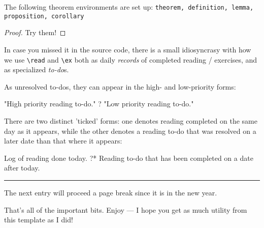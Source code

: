 \documentclass[%
	raggedright, %
]{journal}
\begin{document}

\logday
\begin{theorem}
The following theorem environments are set up: {\tt theorem, definition, lemma,
proposition, corollary}
\end{theorem}
\begin{proof}
Try them!
\end{proof}


\logday[1]
In case you missed it in the source code, there is a small idiosyncrasy with
how we use \verb|\read| and \verb|\ex| both as daily \emph{records} of completed
reading / exercises, and as specialized \emph{to-do}s.

\vspace{1em}
As unresolved to-dos, they can appear in the high- and low-priority forms:
\begin{tasklist}
	\read "High priority reading to-do."
	\read? "Low priority reading to-do."
\end{tasklist}

There are two distinct 'ticked' forms: one denotes reading completed on the same day as it
appears, while the other denotes a reading to-do that was resolved on a later date than
that where it appears:
\begin{tasklist}
	\read* Log of reading done today.
	\read?* Reading to-do that has been completed on a date after today.
\end{tasklist}

{\color{black!20}\hrule}

\vspace{1em}
The next entry will proceed a page break since it is in the new year.


\logday
That's all of the important bits. Enjoy --- I hope you get as much utility from this
template as I did!


\end{document}
